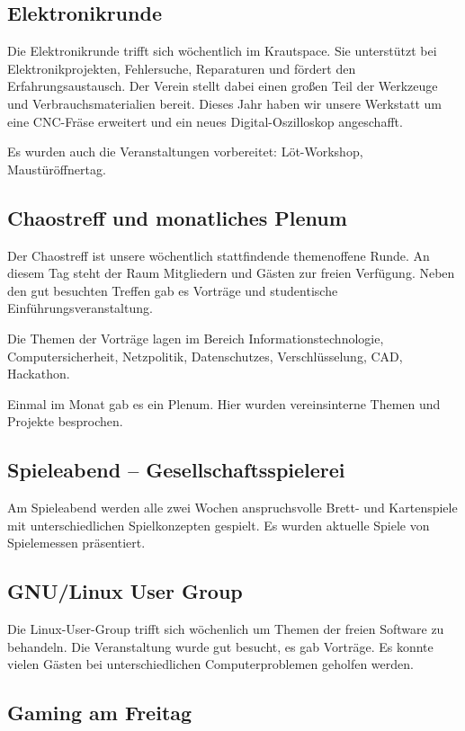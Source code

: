 \documentclass[ngerman]{scrartcl}
\begin{document}
\subsection{Elektronikrunde}

Die Elektronikrunde trifft sich wöchentlich im Krautspace.
Sie unterstützt bei Elektronikprojekten, Fehlersuche,
Reparaturen und fördert den Erfahrungsaustausch.
Der Verein stellt dabei einen großen Teil der Werkzeuge und
Verbrauchsmaterialien bereit.
Dieses Jahr haben wir unsere Werkstatt um eine CNC-Fräse erweitert und
ein neues Digital-Oszilloskop angeschafft.

Es wurden auch die Veranstaltungen vorbereitet: Löt-Workshop, Maustüröffnertag.

\subsection{Chaostreff und monatliches Plenum}

Der Chaostreff ist unsere wöchentlich stattfindende themenoffene Runde.
An diesem Tag steht der Raum Mitgliedern und Gästen zur freien Verfügung.
Neben den gut besuchten Treffen gab es Vorträge und studentische 
Einführungsveranstaltung.

Die Themen der Vorträge lagen im Bereich Informationstechnologie, 
Computersicherheit, Netzpolitik, Datenschutzes, Verschlüsselung, CAD,
Hackathon.

Einmal im Monat gab es ein Plenum. Hier wurden vereinsinterne Themen und Projekte besprochen.

\subsection{Spieleabend -- Gesellschaftsspielerei}

Am Spieleabend werden alle zwei Wochen anspruchsvolle Brett- und
Kartenspiele mit unterschiedlichen Spielkonzepten gespielt.
Es wurden aktuelle Spiele von Spielemessen präsentiert.

\subsection{GNU/Linux User Group}

Die Linux-User-Group trifft sich wöchenlich um Themen der freien Software
zu behandeln. Die Veranstaltung wurde gut besucht, es gab Vorträge. Es
konnte vielen Gästen bei unterschiedlichen Computerproblemen geholfen werden.

\subsection{Gaming am Freitag}
\end{document}
